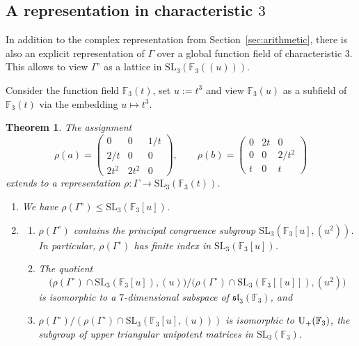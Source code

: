 \documentclass[11pt, a4paper]{amsproc}
\newcommand{\F}{\mathbb{F}}
\newcommand{\SL}{\mathrm{SL}}
\newtheorem{theorem}[thm]{Theorem}
\theoremstyle{remark}
\theoremstyle{plain}
\begin{document}
\subsection{A representation in characteristic $3$}
\label{sec:functionfield}

In addition to the complex representation from Section~\ref{sec:arithmetic}, there is also an explicit
representation of $\Gamma$ over a global function field of characteristic $3$. This allows to view $\Gamma^\circ$ as a lattice in $\SL_3(\F_3((u)))$.

Consider the function field $\F_3(t)$, set $u:=t^3$ and view $\F_3(u)$ as a subfield of $\F_3(t)$ via the
embedding $u\mapsto t^3$.

\begin{theorem}
\label{thm:arithmetic2}
The assignment
\[
\rho(a)=
\begin{pmatrix}
0 & 0 & 1/t\\
2/t & 0 & 0\\
2t^2 & 2t^2 & 0
\end{pmatrix},
\qquad
\rho(b)=
\begin{pmatrix}
0 & 2t & 0\\
0 & 0 & 2/t^2\\
t & 0 & t
\end{pmatrix}
\]
extends to a representation $\rho:\Gamma\to \SL_3(\F_3(t))$.
\begin{enumerate}
    \item We have $\rho(\Gamma^\circ) \leq \SL_3(\F_3[u])$.
    \item
    \begin{enumerate}
    \item $\rho(\Gamma^\circ)$ contains the principal congruence subgroup
    $\SL_3(\F_3[u],(u^2))$.
    In particular, $\rho(\Gamma^\circ)$ has finite index in $\SL_3(\F_3[u])$.
    \item The quotient
    \[
    \bigl(\rho(\Gamma^\circ) \cap \SL_3(\F_3[u]),(u)\bigr)\big/\bigl(\rho(\Gamma^\circ) \cap \SL_3(\F_3[[u]]),(u^2)\bigr)
    \]
    is isomorphic to a $7$-dimensional subspace of ${\mathfrak{sl}}_3(\F_3)$, and
    \item $\rho(\Gamma^\circ)/(\rho(\Gamma^\circ)\cap \SL_3(\F_3[u],(u)))$ is isomorphic to ${\rm U}_+(\F_3)$, the subgroup of upper triangular unipotent matrices in $\SL_3(\F_3)$. 
\end{enumerate}
\end{enumerate}
\end{theorem}
\end{document}
